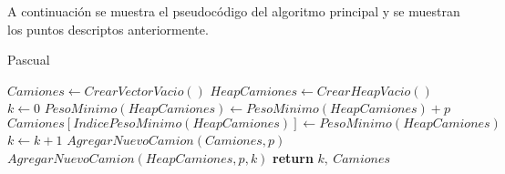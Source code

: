 A continuación se muestra el pseudocódigo del algoritmo principal y se muestran los puntos descriptos anteriormente.

\begin{algorithm}
\caption{Pascual}\label{pascual}
\begin{algorithmic}[1]
	\State $Camiones\gets CrearVectorVacio()$
	\State $HeapCamiones\gets CrearHeapVacio()$
	\State $k\gets 0$
			\State $PesoMinimo(HeapCamiones)\gets PesoMinimo(HeapCamiones)+p$
			\State $Camiones[IndicePesoMinimo(HeapCamiones)]\gets PesoMinimo(HeapCamiones)$\\
		\Else
			\State $k\gets k+1$
			\State $AgregarNuevoCamion(Camiones, p)$
			\State $AgregarNuevoCamion(HeapCamiones, p, k)$
		\EndIf
	\EndFor\label{pascual}
\State \textbf{return} $k,\ Camiones$
\EndProcedure
\end{algorithmic}
\end{algorithm}